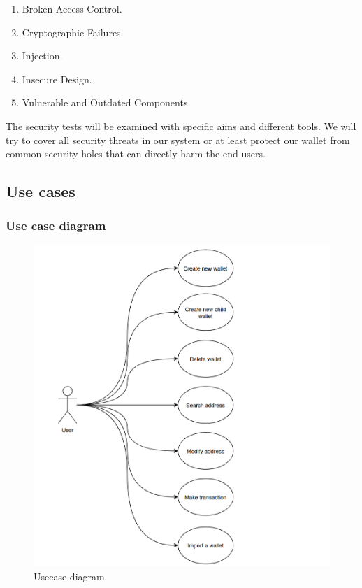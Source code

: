 \begin{enumerate}
    \item Broken Access Control.
    \item Cryptographic Failures.
    \item Injection.
    \item Insecure Design.
    \item Vulnerable and Outdated Components.
\end{enumerate}

The security tests will be examined with specific aims and different tools. We will try to cover all security threats in our system or at least protect our wallet from common security holes that can directly harm the end users.


\subsection{Use cases}

\subsubsection{Use case diagram}

\begin{figure}[!ht]
    \centering
    \includegraphics[width=1\textwidth]{images/usecasediagram.png}
    \caption[Usecase diagram]{Usecase diagram}
    \label{fig:usecases}
\end{figure}

